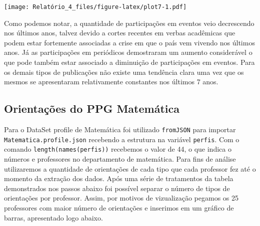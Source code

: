 \documentclass[]{article}
\begin{document}
\texttt{[image: Relatório\_4\_files/figure-latex/plot7-1.pdf]}

Como podemos notar, a quantidade de participações em eventos veio
decrescendo nos últimos anos, talvez devido a cortes recentes em verbas
acadêmicas que podem estar fortemente associadas a crise em que o país
vem vivendo nos últimos anos. Já as participações em periódicos
demostraram um aumento considerável o que pode também estar associado a
diminuição de participações em eventos. Para os demais tipos de
publicações não existe uma tendência clara uma vez que os mesmos se
apresentaram relativamente constantes nos últimos 7 anos.

\subsection{Orientações do PPG
Matemática}\label{orientacoes-do-ppg-matematica}

Para o DataSet profile de Matemática foi utilizado \texttt{fromJSON}
para importar \texttt{Matematica.profile.json} recebendo a estrutura na
variável \texttt{perfis}. Com o comando \texttt{length(names(perfis))}
recebemos o valor de 44, o que indica o números e professores no
departamento de matemática. Para fins de análise utilizaremos a
quantidade de orientações de cada tipo que cada professor fez até o
momento da extração dos dados. Após uma série de tratamentos da tabela
demonstrados nos passos abaixo foi possível separar o número de tipos de
orientações por professor. Assim, por motivos de vizualização pegamos os
25 professores com maior número de orientações e inserimos em um gráfico
de barras, apresentado logo abaixo.
\end{document}
